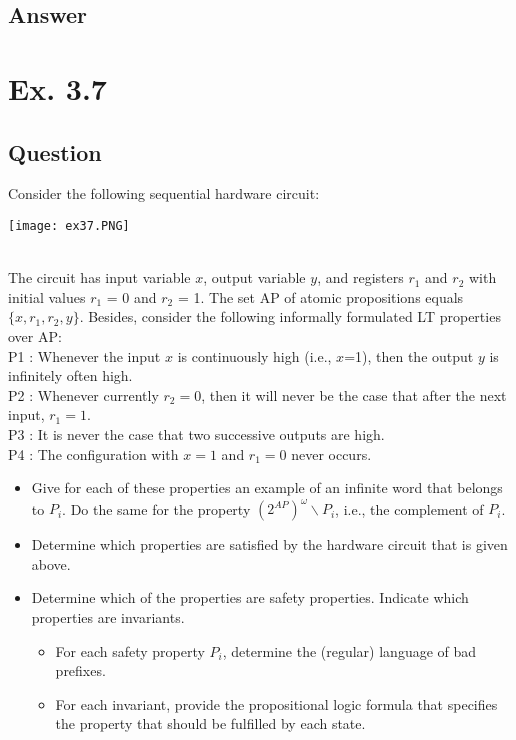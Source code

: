 \documentclass[12pt]{article}
\begin{document}
\subsection*{Answer}

\newpage

\section*{Ex. 3.7}
\subsection*{Question}
Consider the following sequential hardware circuit:\\
\begin{centering}
	\texttt{[image: ex37.PNG]}
\end{centering}\\
The circuit has input variable $x$, output variable $y$, and registers $r_1$ and $r_2$ with initial values
$r_1$ = 0 and $r_2$ = 1. The set AP of atomic propositions equals $\{ x, r_1, r_2, y \}$. Besides, consider the
following informally formulated LT properties over AP:\\
P1 : Whenever the input $x$ is continuously high (i.e., $x$=1), then the output $y$ is infinitely often
high.\\
P2 : Whenever currently $r_2=0$, then it will never be the case that after the next input, $r_1=1$.\\
P3 : It is never the case that two successive outputs are high.\\
P4 : The configuration with $x=1$ and $r_1=0$ never occurs.\\
\begin{itemize}
	\item Give for each of these properties an example of an infinite word that belongs to $P_i$. Do the
	same for the property $(2^{AP})^\omega \backslash P_i $, i.e., the complement of $P_i$.
	\item Determine which properties are satisfied by the hardware circuit that is given above.
	\item Determine which of the properties are safety properties. Indicate which properties are invariants.
	\begin{itemize}
		\item For each safety property $P_i$, determine the (regular) language of bad prefixes.
		\item For each invariant, provide the propositional logic formula that specifies the property
		that should be fulfilled by each state.
	\end{itemize}
\end{itemize}
\end{document}
